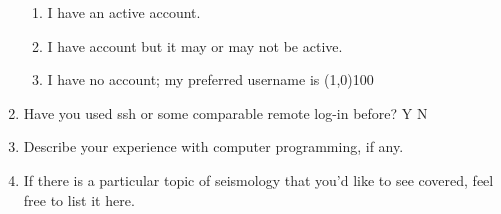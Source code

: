 \documentclass[11pt,titlepage,fleqn]{article}
\begin{document}
\begin{enumerate}
\begin{enumerate}
\item I have an active account.
\item I have account but it may or may not be active.
\item I have no account; my preferred username is \line(1,0){100}
\end{enumerate}

\item Have you used ssh or some comparable remote log-in before? Y N

\item Describe your experience with computer programming, if any.

\vspace{0.5cm}


\item If there is a particular topic of
seismology
that you'd like to see covered, feel free to list it here.
\end{enumerate}

\end{document}
